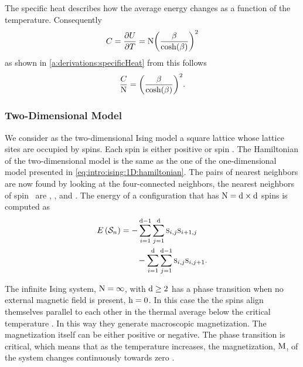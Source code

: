 	The specific heat describes how the average energy changes as a function of the temperature. Consequently
	\begin{equation*}
		C = \frac{\partial U}{\partial T} = \mathrm{N} {\left(\frac{\beta}{\cosh(\beta)}\right)}^{2}
	\end{equation*}
	as shown in \cref{a:derivations:specificHeat} \cite{warkHandout} from this follows
	\begin{equation*}
	 	\frac{C}{\mathrm{N}} = {\left(\frac{\beta}{\cosh(\beta)}\right)}^2.
	 \end{equation*}
 
\subsubsection{Two-Dimensional Model}
	\label{sss:intro:ising:2D}
	We consider as the two-dimensional Ising model a square lattice whose lattice sites are occupied by spins. Each spin is either positive or spin \cite{kenzel1997physics}. The Hamiltonian of the two-dimensional model is the same as the one of the one-dimensional model presented in \cref{eq:intro:ising:1D:hamiltonian}. The pairs of nearest neighbors are now found by looking at the four-connected neighbors, \ie the nearest neighbors of \mbox{spin } are , ,  and . The energy of a configuration  that has $\mathrm{N} = \mathrm{d} \times \mathrm{d}$ spins is computed as
	\begin{equation}
		\label{eq:intro:ising:2d:energy}
		\begin{split}
		E\left(\mathcal{S}_{n} \right) 
			& = - \sum_{i = 1}^{\mathrm{d} - 1}\sum_{j = 1}^{\mathrm{d}} \textsc{s}_{i,j}\textsc{s}_{i+1,j}\\
			&\quad\quad - \sum_{i = 1}^{\mathrm{d}}\sum_{j = 1}^{\mathrm{d} - 1} \textsc{s}_{i,j} \textsc{s}_{i, j+1}.
		\end{split}
	\end{equation}

	The infinite Ising system, \ie $\mathrm{N} = \infty$, with $\mathrm{d} \geq 2$ has a phase transition when no external magnetic field is present, \ie $\mathrm{h} = 0$. In this case the the spins align themselves parallel to each other in the thermal average below the critical temperature \criticalTemperature. In this way they generate macroscopic magnetization. The magnetization itself can be either positive or negative. The phase transition is critical, which means that as the temperature increases, the magnetization, $\mathrm{M}$, of the system changes continuously towards zero \cite{kenzel1997physics}. 

